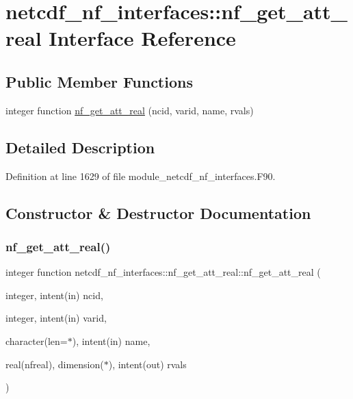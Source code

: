 \hypertarget{interfacenetcdf__nf__interfaces_1_1nf__get__att__real}{}\section{netcdf\+\_\+nf\+\_\+interfaces\+:\+:nf\+\_\+get\+\_\+att\+\_\+real Interface Reference}
\label{interfacenetcdf__nf__interfaces_1_1nf__get__att__real}
\subsection*{Public Member Functions}
\begin{DoxyCompactItemize}
\item 
integer function \hyperlink{interfacenetcdf__nf__interfaces_1_1nf__get__att__real_a7d81bc1da3873a985edc90610fb15a81}{nf\+\_\+get\+\_\+att\+\_\+real} (ncid, varid, name, rvals)
\end{DoxyCompactItemize}


\subsection{Detailed Description}


Definition at line 1629 of file module\+\_\+netcdf\+\_\+nf\+\_\+interfaces.\+F90.



\subsection{Constructor \& Destructor Documentation}
\mbox{\label{interfacenetcdf__nf__interfaces_1_1nf__get__att__real_a7d81bc1da3873a985edc90610fb15a81}} 
\subsubsection{\texorpdfstring{nf\+\_\+get\+\_\+att\+\_\+real()}{nf\_get\_att\_real()}}
{\footnotesize\ttfamily integer function netcdf\+\_\+nf\+\_\+interfaces\+::nf\+\_\+get\+\_\+att\+\_\+real\+::nf\+\_\+get\+\_\+att\+\_\+real (\begin{DoxyParamCaption}\item[{integer, intent(in)}]{ncid,  }\item[{integer, intent(in)}]{varid,  }\item[{character(len=$\ast$), intent(in)}]{name,  }\item[{real(nfreal), dimension($\ast$), intent(out)}]{rvals }\end{DoxyParamCaption})}



